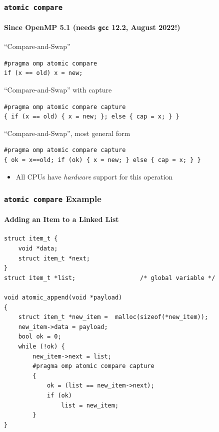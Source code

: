 \documentclass{beamer}
\begin{document}

\begin{frame}[fragile=singleslide]
  \frametitle{\texttt{atomic compare}}
  \framesubtitle{Since OpenMP 5.1 (needs \texttt{gcc} 12.2, August 2022!)} 

  \begin{exampleblock}{``Compare-and-Swap''}
\vspace*{-2ex}
\begin{verbatim}
#pragma omp atomic compare
if (x == old) x = new; 
\end{verbatim}
  \end{exampleblock}

  \begin{block}{``Compare-and-Swap'' with capture}
\vspace*{-2ex}
\begin{verbatim}
#pragma omp atomic compare capture
{ if (x == old) { x = new; }; else { cap = x; } }
\end{verbatim}
  \end{block}
  
  \begin{alertblock}{``Compare-and-Swap'', most general form}
\vspace*{-2ex}
\begin{verbatim}
#pragma omp atomic compare capture 
{ ok = x==old; if (ok) { x = new; } else { cap = x; } }
\end{verbatim}
  \end{alertblock}

  \begin{itemize}
  \item All CPUs have \emph{hardware} support for this operation
  \end{itemize}
\end{frame}

  
\begin{frame}[fragile, label=CAS_list]
  \frametitle{\texttt{atomic compare} Example}
  \framesubtitle{Adding an Item to a Linked List}

\begin{verbatim}
struct item_t {
    void *data;
    struct item_t *next;
}
struct item_t *list;                  /* global variable */

void atomic_append(void *payload)
{
    struct item_t *new_item =  malloc(sizeof(*new_item));
    new_item->data = payload;
    bool ok = 0;
    while (!ok) {
        new_item->next = list;
        #pragma omp atomic compare capture
        {
            ok = (list == new_item->next);
            if (ok)
                list = new_item;
        }
}
\end{verbatim}
\end{frame}
\end{document}
